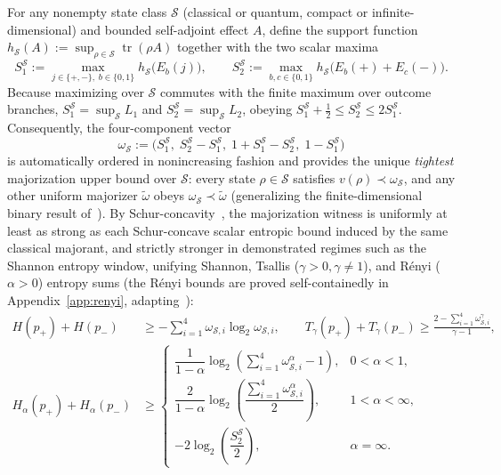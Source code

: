 \documentclass{iopjournal}
\newcommand{\tr}{\operatorname{tr}}
\newcommand{\Sset}{\mathcal{S}}
\begin{document}
For any nonempty state class $\Sset$ (classical or quantum, compact or infinite-dimensional) and bounded self-adjoint effect $A$, define the support function $h_{\Sset}(A) := \sup_{\rho \in \Sset}\tr(\rho A)$ together with the two scalar maxima
\begin{equation}\label{eq:S1-S2-def}
S_1^{\Sset} := \max_{j \in \{+,-\},\; b \in \{0,1\}} h_{\Sset}\bigl(E_b(j)\bigr), \qquad
S_2^{\Sset} := \max_{b,c \in \{0,1\}} h_{\Sset}\bigl(E_b(+) + E_c(-)\bigr).
\end{equation}
Because maximizing over $\Sset$ commutes with the finite maximum over outcome branches, $S_1^{\Sset} = \sup_{\Sset} L_1$ and $S_2^{\Sset} = \sup_{\Sset} L_2$, obeying $S_1^{\Sset} + \frac{1}{2} \le S_2^{\Sset} \le 2S_1^{\Sset}$. Consequently, the four-component vector
\begin{equation}\label{eq:omega-def}
\omega_{\Sset} := \bigl(S_1^{\Sset},\; S_2^{\Sset} - S_1^{\Sset},\; 1 + S_1^{\Sset} - S_2^{\Sset},\; 1 - S_1^{\Sset}\bigr)
\end{equation}
is automatically ordered in nonincreasing fashion and provides the unique \emph{tightest} majorization upper bound over $\Sset$: every state $\rho \in \Sset$ satisfies $v(\rho) \prec \omega_{\Sset}$, and any other uniform majorizer $\tilde\omega$ obeys $\omega_{\Sset} \prec \tilde\omega$ (generalizing the finite-dimensional binary result of~\cite{ZhuManuscript}). By Schur-concavity~\cite{MarshallOlkin2011,CicaleseVaccaro2002,Bosyk2019,Friedland2013,Rudnicki2014}, the majorization witness is uniformly at least as strong as each Schur-concave scalar entropic bound induced by the same classical majorant, and strictly stronger in demonstrated regimes such as the Shannon entropy window, unifying Shannon, Tsallis ($\gamma > 0, \gamma \neq 1$), and R\'enyi ($\alpha > 0$) entropy sums (the R\'enyi bounds are proved self-containedly in Appendix~\ref{app:renyi}, adapting~\cite{Baek2019,ZhuManuscript}):
\begin{align}
H(p_+) + H(p_-) &\ge -\sum_{i=1}^4 \omega_{\Sset,i}\log_2 \omega_{\Sset,i}, \qquad
T_\gamma(p_+) + T_\gamma(p_-) \ge \frac{2 - \sum_{i=1}^4 \omega_{\Sset,i}^\gamma}{\gamma - 1}, \label{eq:shannon-tsallis-bound}\\
H_\alpha(p_+) + H_\alpha(p_-) &\ge
\begin{cases}
\dfrac{1}{1-\alpha}\log_2\!\left(\sum_{i=1}^4 \omega_{\Sset,i}^\alpha - 1\right), & 0 < \alpha < 1, \\[9pt]
\dfrac{2}{1-\alpha}\log_2\!\left(\dfrac{\sum_{i=1}^4 \omega_{\Sset,i}^\alpha}{2}\right), & 1 < \alpha < \infty, \\[9pt]
-2\log_2\!\left(\dfrac{S_2^{\Sset}}{2}\right), & \alpha = \infty.
\end{cases} \label{eq:renyi-bound}
\end{align}
\end{document}
